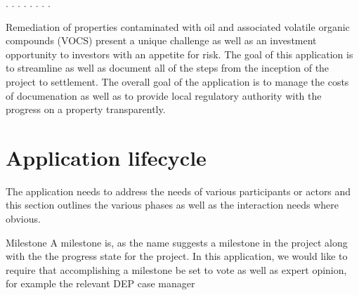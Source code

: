 \documentclass[12pt]{report}
\begin{document}

\begin{coqdoccode}
\coqdocemptyline
\coqdocnoindent
{}     .\coqdoceol
\coqdocnoindent
{}  .\coqdoceol
\coqdocnoindent
{}  .\coqdoceol
\coqdocnoindent
{}  .\coqdoceol
\coqdocnoindent
{}    .\coqdoceol
\coqdocnoindent
{}.\coqdoceol
\coqdocnoindent
{}  .\coqdoceol
\coqdocnoindent
{}   .\coqdoceol
\coqdocemptyline
\end{coqdoccode}
Remediation of properties contaminated with oil and associated volatile organic compounds (VOCS) present a unique challenge as well as an investment opportunity to investors with an appetite for risk. The goal of this application is to streamline as well as document all of the steps from the inception of the project to settlement. The overall goal of the application is to manage the costs of documenation as well as to provide local regulatory authority with the progress on a property transparently. 


\section{Application lifecycle}

 The application needs to address the needs of various participants or actors and this section 
outlines the various phases as well as the interaction needs where obvious. 

 Milestone  A milestone is, as the name suggests a milestone in the project along with the the progress state for the project. 
In this application, we would like to require that accomplishing a milestone be set to vote as well as expert opinion, for example 
the relevant DEP case manager
\end{document}
